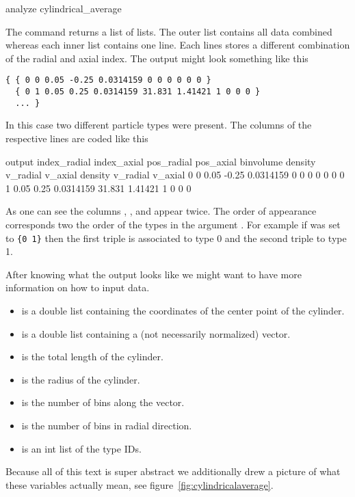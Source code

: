 \begin{essyntax}
  analyze cylindrical_average  
     
\end{essyntax}

The command returns a list of lists.  The outer list contains all data
combined whereas each inner list contains one line.  Each lines stores
a different combination of the radial and axial index.  The output
might look something like this
\begin{verbatim}
{ { 0 0 0.05 -0.25 0.0314159 0 0 0 0 0 0 }
  { 0 1 0.05 0.25 0.0314159 31.831 1.41421 1 0 0 0 }
  ... }
\end{verbatim}
In this case two different particle types were present.  The columns
of the respective lines are coded like this
\begin{SaveVerbatim}{output}
index_radial index_axial pos_radial pos_axial binvolume density v_radial v_axial density v_radial v_axial
0            0           0.05       -0.25     0.0314159 0       0        0       0       0        0
0            1           0.05       0.25      0.0314159 31.831  1.41421  1       0       0        0
\end{SaveVerbatim}
\bigbreak\noindent%
\bigbreak\noindent%
%
As one can see the columns , , and
 appear twice.  The order of appearance corresponds
two the order of the types in the argument .  For example
if  was set to \Verb|{0 1}| then the first triple is
associated to type 0 and the second triple to type 1.

After knowing what the output looks like we might want to have more
information on how to input data.
\begin{itemize}
\item {} is a double list containing the coordinates of the
  center point of the cylinder.
\item {} is a double list containing a (not necessarily
  normalized) vector.
\item {} is the total length of the cylinder.
\item {} is the radius of the cylinder.
\item {} is the number of bins along the 
  vector.
\item {} is the number of bins in radial direction.
\item {} is an int list of the type IDs.
\end{itemize}
Because all of this text is super abstract we additionally drew a
picture of what these variables actually mean, see
figure~\ref{fig:cylindricalaverage}.


